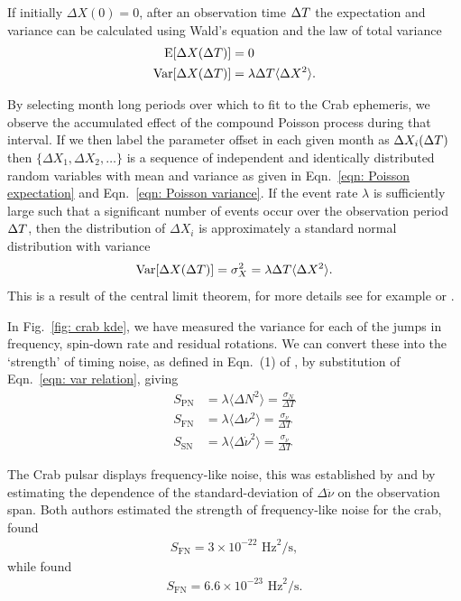 \documentclass[../full_thesis/full_thesis.tex]{subfiles}
\begin{document}
\begin{subappendices}
If initially $\Delta X(0)=0$, after an observation time $\Delta T$  the
expectation and variance can be calculated using Wald's equation \citep{wald1944cumulative}
and the law of total variance \citep{weiss2006course}
\begin{align}
\textrm{E}[\Delta X(\Delta T)] & = 0
\label{eqn: Poisson expectation} \\
\textrm{Var}[\Delta X(\Delta T)] &  = \lambda \Delta T \langle\Delta X^{2}\rangle.
\label{eqn: Poisson variance}
\end{align}

By selecting month long periods over which to fit to the Crab ephemeris, we
observe the accumulated effect of the compound Poisson process during that
interval. If we then label the parameter offset in each given month as $\Delta
X_{i}(\Delta T)$ then $\{\Delta X_{1}, \Delta X_{2}, \dots\}$ is a sequence of
independent and identically distributed random variables with mean and variance
as given in Eqn.~\eqref{eqn: Poisson expectation} and Eqn.~\eqref{eqn: Poisson
variance}. If the event rate $\lambda$ is sufficiently large such that a
significant number of events occur over the observation period $\Delta T$, then the
distribution of $\Delta X_{i}$ is approximately a standard normal distribution
with variance 
\begin{align}
\textrm{Var}[\Delta X(\Delta T)] =\sigma_{X}^{2} = \lambda \Delta T \langle\Delta X^{2}\rangle .
\label{eqn: var relation}
\end{align}
This is a result of the central limit theorem, for more details see for
example \citet{Feller1968} or \citet{weiss2006course}.

In Fig.~\ref{fig: crab kde}, we have measured the variance for each of the
jumps in frequency, spin-down rate and residual rotations. We can convert these
into the `strength' of timing noise, as defined in Eqn.~(1) of \citet{Cordes1981},
by substitution of Eqn.~\eqref{eqn: var relation}, giving
\begin{align}
S_{\mathrm{PN}} & = \lambda \langle \Delta N^{2} \rangle = \frac{\sigma_N}{\Delta T} \\
S_{\mathrm{FN}} & = \lambda \langle \Delta \nu^{2} \rangle = \frac{\sigma_\nu}{\Delta T}
\label{eqn: SFN} \\
S_{\mathrm{SN}} & = \lambda \langle \Delta \dot{\nu}^{2} \rangle = 
\frac{\sigma_{\dot{\nu}}}{\Delta T}
\end{align}

The Crab pulsar displays frequency-like noise, this was established by
\citet{Boynton1972} and \citet{Cordes1981} by estimating the dependence of
the standard-deviation of $\Delta \ddot{\nu}$ on the observation span. Both
authors estimated the strength of frequency-like noise for the crab,
\citet{Boynton1972} found
\begin{align}
S_{\mathrm{FN}} = 3 \times 10^{-22} \textrm{ Hz}^{2}/\textrm{s},
\end{align}
while \citet{Cordes1981} found
\begin{align}
S_{\mathrm{FN}} = 6.6 \times 10^{-23} \textrm{ Hz}^{2}/\textrm{s}.
\end{align}


\end{subappendices}
\end{document}
